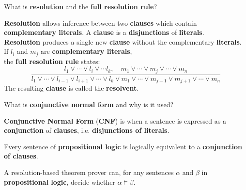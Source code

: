 \begin{flashcard}[Question]{What is \textbf{resolution} and the \textbf{full resolution rule}?}
\begin{center}
\textbf{Resolution} allows inference between two \textbf{clauses} which contain \textbf{complementary literals}. A \textbf{clause} is a \textbf{disjunctions} of \textbf{literals}.\\\textbf{Resolution} produces a single new \textbf{clause} without the complementary \textbf{literals}. If $l_i$ and $m_j$ are \textbf{complementary literals},\\the \textbf{full resolution rule} states:
\begin{displaymath}
\frac{l_1 \lor \cdots \lor l_i \lor \cdots l_k, \quad m_1 \lor \cdots \lor m_j \lor \cdots \lor m_n}
{l_1 \lor \cdots \lor l_{i-1} \lor l_{i+1} \lor \cdots \lor l_k \lor m_1 \lor \cdots \lor m_{j-1} \lor m_{j+1} \lor \cdots \lor m_n}
\end{displaymath}
The resulting \textbf{clause} is called the \textbf{resolvent}.
\end{center}
\end{flashcard}

\begin{flashcard}[Question]{What is \textbf{conjunctive normal form} and why is it used?}
\begin{center}
\textbf{Conjunctive Normal Form} (\textbf{CNF}) is when a sentence is expressed as a \textbf{conjunction} of \textbf{clauses}, i.e. \textbf{disjunctions of literals}.

\medskip

Every sentence of \textbf{propositional logic} is logically equivalent to a \textbf{conjunction of clauses}.

\medskip

A resolution-based theorem prover can, for any sentences $\alpha$ and $\beta$ in \textbf{propositional logic}, decide whether $\alpha \models \beta$.
\end{center}
\end{flashcard}

